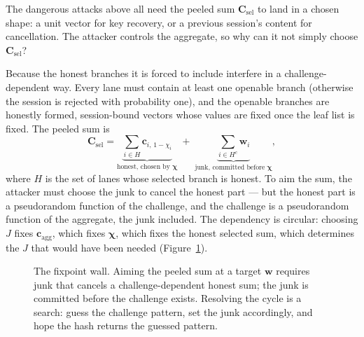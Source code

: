 \documentclass[11pt]{article}
\begin{document}
The dangerous attacks above all need the peeled sum $\mathbf C_{\mathrm{sel}}$
to land in a chosen shape: a unit vector for key recovery, or a previous
session's content for cancellation.  The attacker controls the aggregate, so
why can it not simply choose $\mathbf C_{\mathrm{sel}}$?

Because the honest branches it is forced to include interfere in a
challenge-dependent way.  Every lane must contain at least one openable branch
(otherwise the session is rejected with probability one), and the openable
branches are honestly formed, session-bound vectors whose values are fixed
once the leaf list is fixed.  The peeled sum is
\[
 \mathbf C_{\mathrm{sel}}
 =\underbrace{\sum_{i\in H}\mathbf c_{i,\,1-\chi_i}}_{\text{honest, chosen
    by }\boldsymbol\chi}
 \;+\;\underbrace{\sum_{i\in H^{c}}\mathbf w_i}_{\text{junk, committed
    before }\boldsymbol\chi},
\]
where $H$ is the set of lanes whose selected branch is honest.  To aim the
sum, the attacker must choose the junk to cancel the honest part --- but the
honest part is a pseudorandom function of the challenge, and the challenge is
a pseudorandom function of the aggregate, the junk included.  The dependency
is circular:
choosing $J$ fixes $\mathbf c_{\mathrm{agg}}$, which fixes
$\boldsymbol\chi$, which fixes the honest selected sum, which determines the
$J$ that would have been needed (Figure~\ref{fig:fixpoint}).

\begin{figure}[t]
\centering
{}
\caption{The fixpoint wall.  Aiming the peeled sum at a target $\mathbf w$
requires junk that cancels a challenge-dependent honest sum; the junk is
committed before the challenge exists.  Resolving the cycle is a search:
guess the challenge pattern, set the junk accordingly, and hope the hash
returns the guessed pattern.}
\label{fig:fixpoint}
\end{figure}
\end{document}
